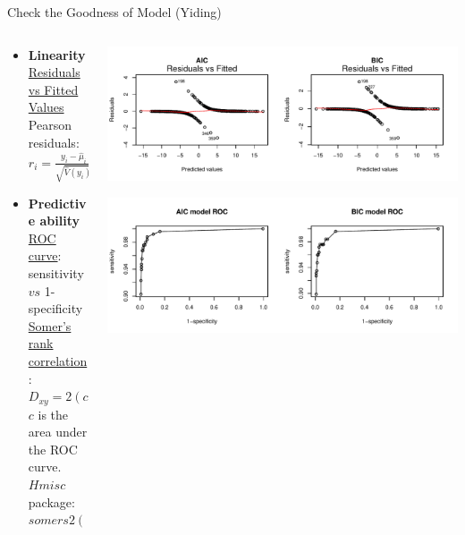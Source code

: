 \documentclass[table]{beamer}\usepackage[]{graphicx}\usepackage[]{color}
\makeatletter
\def\maxwidth{ %
  \ifdim\Gin@nat@width>\linewidth
    \linewidth
  \else
    \Gin@nat@width
  \fi
}
\newenvironment{knitrout}{}{} %
\makeatother
\begin{document}
\begin{frame}{Check the Goodness of Model (Yiding)}
\begin{columns}[t]
\begin{column}[t]{5cm}
{\fontsize{0.3cm}{1em}\selectfont
\begin{itemize}
\item \textbf{Linearity}\\
\underline{Residuals vs Fitted Values}\\
Pearson residuals:\\
$r_i=\frac{y_i-\hat{\mu}_i}{\sqrt{\hat{V}(y_i)}}=\frac{y_i-n_i\hat{\pi}_i}{\sqrt{n_i\hat{\pi}_i(1-\hat{\pi}_i)}}$\\[3\baselineskip]

\item{\textbf{Predictive ability}}\\
\underline{ROC curve}:\\
sensitivity $vs$ 1-specificity\\
\underline{Somer's rank correlation}:\\
$D_{xy}=2(c-0.5)$\\
$c$ is the area under the ROC curve.\\[1\baselineskip]
$Hmisc$ package: $somers2()$
\end{itemize}

}
\end{column}

\begin{column}[t]{7cm}
\begin{knitrout}
\color{fgcolor}
\includegraphics[width=\maxwidth]{figure/AIC_BIC_RESIDUALS} 

\end{knitrout}


\begin{knitrout}
\color{fgcolor}
\includegraphics[width=\maxwidth]{figure/prdict_ability} 


\end{knitrout}
\end{column}
\end{columns}
\end{frame}
\end{document}
